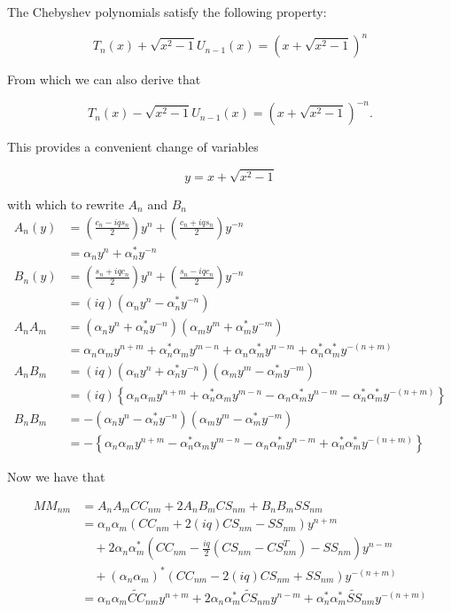 \documentclass[apj]{emulateapj}
\newcommand{\CCt}{\widetilde{CC}}
\newcommand{\CSt}{\widetilde{CS}}
\newcommand{\SSt}{\widetilde{SS}}
\begin{document}
\begin{appendix}
The Chebyshev polynomials satisfy the following property:

\begin{equation}
T_n(x) + \sqrt{x^2 - 1}U_{n-1}(x) = (x + \sqrt{x^2 - 1})^n
\end{equation}

From which we can also derive that

\begin{equation}
T_n(x) - \sqrt{x^2 - 1}U_{n-1}(x) = (x + \sqrt{x^2 - 1})^{-n}.
\end{equation}

This provides a convenient change of variables

\begin{equation}
y = x + \sqrt{x^2 - 1}
\end{equation}

with which to rewrite $A_n$ and $B_n$
\begin{align}
A_n(y) &= \left(\frac{c_n - iqs_n}{2}\right)y^n + \left(\frac{c_n + iqs_n}{2}\right)y^{-n}\\
       &= \alpha_ny^n + \alpha^{*}_ny^{-n}\\
B_n(y) &= \left(\frac{s_n + iqc_n}{2}\right)y^n + \left(\frac{s_n - iqc_n}{2}\right)y^{-n}\\
       &= (iq)\left(\alpha_ny^n - \alpha^{*}_ny^{-n}\right)\\
A_nA_m &= \left(\alpha_ny^n + \alpha^{*}_ny^{-n}\right)\left(\alpha_my^m + \alpha^{*}_my^{-m}\right)\\
       &= \alpha_n\alpha_m y^{n+m} + \alpha^{*}_n\alpha_my^{m-n} + \alpha_n\alpha^{*}_m y^{n-m} + \alpha^{*}_n\alpha^{*}_my^{-(n+m)}\\
A_nB_m &= (iq)\left(\alpha_ny^n + \alpha^{*}_ny^{-n}\right)\left(\alpha_my^m - \alpha^{*}_my^{-m}\right)\\
       &= (iq)\left\{\alpha_n\alpha_m y^{n+m} + \alpha^{*}_n\alpha_my^{m-n} - \alpha_n\alpha^{*}_m y^{n-m} - \alpha^{*}_n\alpha^{*}_my^{-(n+m)}\right\}\\
B_nB_m &= -\left(\alpha_ny^n - \alpha^{*}_ny^{-n}\right)\left(\alpha_my^m - \alpha^{*}_my^{-m}\right)\\
       &= -\left\{\alpha_n\alpha_m y^{n+m} - \alpha^{*}_n\alpha_my^{m-n} - \alpha_n\alpha^{*}_m y^{n-m} + \alpha^{*}_n\alpha^{*}_my^{-(n+m)}\right\}
\end{align}

Now we have that 

\begin{align}
MM_{nm} &= A_nA_mCC_{nm} + 2A_nB_mCS_{nm} + B_nB_mSS_{nm}\\
        &= \alpha_n\alpha_m\left(CC_{nm} + 2(iq)CS_{nm} - SS_{nm}\right)y^{n+m}\\
        &\quad + 2\alpha_n\alpha^{*}_m\left(CC_{nm} - \frac{iq}{2}\left(CS_{nm} - CS^{T}_{nm}\right) - SS_{nm}\right)y^{n-m}\\
        &\quad + (\alpha_n\alpha_m)^{*}\left(CC_{nm}  - 2(iq)CS_{nm} + SS_{nm}\right)y^{-(n+m)}\\
        &= \alpha_n\alpha_m\CCt_{nm}y^{n+m} + 2\alpha_n\alpha^{*}_m\CSt_{nm}y^{n-m} + \alpha^{*}_n\alpha^{*}_m\SSt_{nm}y^{-(n+m)}
\end{align}


\end{appendix}
\end{document}
